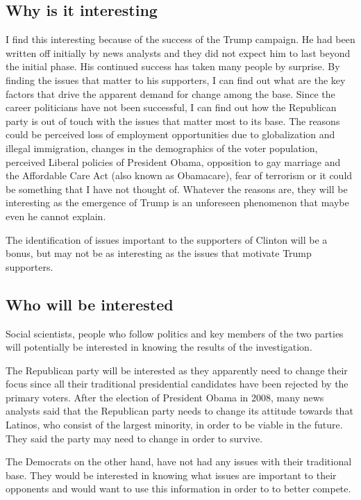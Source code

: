 \documentclass{sig-alternate-05-2015}
\begin{document}
\subsection{Why is it interesting}
I find this interesting because of the success of the Trump campaign. He had been written off initially by news analysts and they did not expect him to last beyond the initial phase. His continued success has taken many people by surprise. By finding the issues that matter to his supporters, I can find out what are the key factors that drive the apparent demand for change among the base. Since the career politicians have not been successful, I can find out how the Republican party is out of touch with the issues that matter most to its base. The reasons could be perceived loss of employment opportunities due to globalization and illegal immigration, changes in the demographics of the voter population, perceived Liberal policies of President Obama, opposition to gay marriage and the Affordable Care Act (also known as Obamacare), fear of terrorism or it could be something that I have not thought of. Whatever the reasons are, they will be interesting as the emergence of Trump is an unforeseen phenomenon that maybe even he cannot explain.

The identification of issues important to the supporters of Clinton will be a bonus, but may not be as interesting as the issues that motivate Trump supporters.

\subsection{Who will be interested}
Social scientists, people who follow politics and key members of the two parties will potentially be interested in knowing the results of the investigation. 

The Republican party will be interested as they apparently need to change their focus since all their traditional presidential candidates have been rejected by the primary voters. After the election of President Obama in 2008, many news analysts said that the Republican party needs to change its attitude towards that Latinos, who consist of the largest minority, in order to be viable in the future. They said the party may need to change in order to survive.  

The Democrats on the other hand, have not had any issues with their traditional base. They would be interested in knowing what issues are important to their opponents and would want to use this information in order to to better compete.
\end{document}
